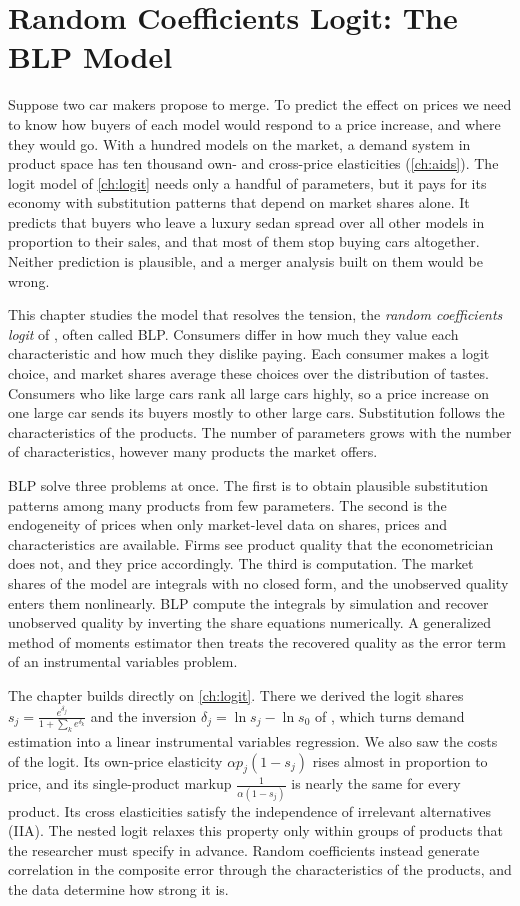 \chapter{Random Coefficients Logit: The BLP Model}\label{ch:blp}

Suppose two car makers propose to merge. To predict the effect on prices we need to know how buyers of each
model would respond to a price increase, and where they would go. With a hundred models on the market, a demand
system in product space has ten thousand own- and cross-price elasticities (\cref{ch:aids}). The logit model of
\cref{ch:logit} needs only a handful of parameters, but it pays for its economy with substitution patterns that
depend on market shares alone. It predicts that buyers who leave a luxury sedan spread over all other models in
proportion to their sales, and that most of them stop buying cars altogether. Neither prediction is plausible,
and a merger analysis built on them would be wrong.

This chapter studies the model that resolves the tension, the \emph{random coefficients logit} of
\citet{BerryLevinsohnPakes1995}, often called BLP. Consumers differ in how much they value each characteristic
and how much they dislike paying. Each consumer makes a logit choice, and market shares average these choices
over the distribution of tastes. Consumers who like large cars rank all large cars highly, so a price increase
on one large car sends its buyers mostly to other large cars. Substitution follows the characteristics of the
products. The number of parameters grows with the number of characteristics, however many products the market
offers.

BLP solve three problems at once. The first is to obtain plausible substitution patterns among many products
from few parameters. The second is the endogeneity of prices when only market-level data on shares, prices and
characteristics are available. Firms see product quality that the econometrician does not, and they price
accordingly. The third is computation. The market shares of the model are integrals with no closed form, and the
unobserved quality enters them nonlinearly. BLP compute the integrals by simulation and recover unobserved
quality by inverting the share equations numerically. A generalized method of moments estimator then treats the
recovered quality as the error term of an instrumental variables problem.

The chapter builds directly on \cref{ch:logit}. There we derived the logit shares
$s_j = \frac{e^{\delta_j}}{1 + \sum_k e^{\delta_k}}$ and the inversion $\delta_j = \ln s_j - \ln s_0$ of
\citet{Berry1994}, which turns demand estimation into a linear instrumental variables regression. We also saw the
costs of the logit. Its own-price elasticity $\alpha p_j(1 - s_j)$ rises almost in proportion to price, and its
single-product markup $\frac{1}{\alpha(1 - s_j)}$ is nearly the same for every product. Its cross elasticities
satisfy the independence of irrelevant alternatives (IIA). The nested logit relaxes this property only within groups
of products that the researcher must specify in advance. Random coefficients instead generate correlation in the
composite error through the characteristics of the products, and the data determine how strong it is.

